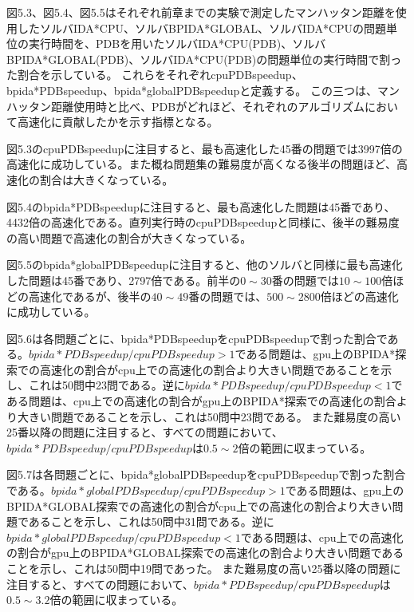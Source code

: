 \documentclass[a4paper,11pt,oneside,openany]{jsbook}
\begin{document}


図5.3、図5.4、図5.5はそれぞれ前章までの実験で測定したマンハッタン距離を使用したソルバIDA*CPU、ソルバBPIDA*GLOBAL、ソルバIDA*CPUの問題単位の実行時間を、PDBを用いたソルバIDA*CPU(PDB)、ソルバBPIDA*GLOBAL(PDB)、ソルバIDA*CPU(PDB)の問題単位の実行時間で割った割合を示している。
これらをそれぞれcpuPDBspeedup、bpida*PDBspeedup、bpida*globalPDBspeedupと定義する。
この三つは、マンハッタン距離使用時と比べ、PDBがどれほど、それぞれのアルゴリズムにおいて高速化に貢献したかを示す指標となる。

図5.3のcpuPDBspeedupに注目すると、最も高速化した45番の問題では3997倍の高速化に成功している。また概ね問題集の難易度が高くなる後半の問題ほど、高速化の割合は大きくなっている。

図5.4のbpida*PDBspeedupに注目すると、最も高速化した問題は45番であり、4432倍の高速化である。直列実行時のcpuPDBspeedupと同様に、後半の難易度の高い問題で高速化の割合が大きくなっている。

図5.5のbpida*globalPDBspeedupに注目すると、他のソルバと同様に最も高速化した問題は45番であり、2797倍である。前半の$0\sim30$番の問題では$10\sim100$倍ほどの高速化であるが、後半の$40\sim49$番の問題では、$500\sim2800$倍ほどの高速化に成功している。


図5.6は各問題ごとに、bpida*PDBspeedupをcpuPDBspeedupで割った割合である。$bpida*PDBspeedup/cpuPDBspeedup > 1$である問題は、gpu上のBPIDA*探索での高速化の割合がcpu上での高速化の割合より大きい問題であることを示し、これは50問中23問である。逆に$bpida*PDBspeedup/cpuPDBspeedup < 1$である問題は、cpu上での高速化の割合がgpu上のBPIDA*探索での高速化の割合より大きい問題であることを示し、これは50問中23問である。
また難易度の高い25番以降の問題に注目すると、すべての問題において、$bpida*PDBspeedup/cpuPDBspeedup$は$0.5\sim2$倍の範囲に収まっている。

図5.7は各問題ごとに、bpida*globalPDBspeedupをcpuPDBspeedupで割った割合である。$bpida*globalPDBspeedup/cpuPDBspeedup > 1$である問題は、gpu上のBPIDA*GLOBAL探索での高速化の割合がcpu上での高速化の割合より大きい問題であることを示し、これは50問中31問である。逆に$bpida*globalPDBspeedup/cpuPDBspeedup < 1$である問題は、cpu上での高速化の割合がgpu上のBPIDA*GLOBAL探索での高速化の割合より大きい問題であることを示し、これは50問中19問であった。
また難易度の高い25番以降の問題に注目すると、すべての問題において、$bpida*PDBspeedup/cpuPDBspeedup$は$0.5\sim3.2$倍の範囲に収まっている。
\end{document}
